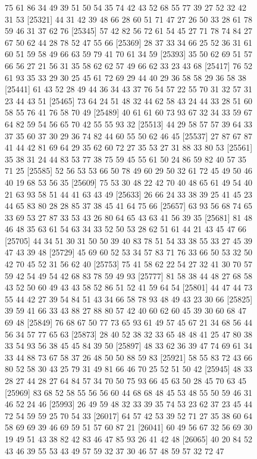 \documentclass{article}
\begin{document}
\begin{figure}[H]
\begin{Schunk}
\begin{Soutput}
[25297] 75 61 86 34 49 39 51 50 54 35 74 42 43 52 68 55 77 39 27 52 32 42 31 53
[25321] 44 31 42 39 48 66 28 60 51 71 47 27 26 50 33 28 61 78 59 46 31 37 62 76
[25345] 57 42 82 56 72 61 54 45 27 71 78 74 84 27 67 50 62 44 28 78 52 47 55 66
[25369] 28 37 33 34 66 25 52 36 31 61 60 51 59 58 49 66 63 59 79 41 70 61 34 59
[25393] 35 50 62 69 51 57 66 56 27 21 56 31 35 58 62 62 57 49 66 62 33 23 43 68
[25417] 76 52 61 93 35 33 29 30 25 45 61 72 69 29 44 40 29 36 58 58 29 36 58 38
[25441] 61 43 52 28 49 44 36 34 43 37 76 54 57 22 55 70 31 32 57 31 23 44 43 51
[25465] 73 64 24 51 48 32 44 62 58 43 24 44 33 28 51 60 58 55 76 41 76 58 70 49
[25489] 40 61 61 60 73 93 67 32 34 33 59 67 64 82 59 54 56 65 70 42 55 55 93 32
[25513] 44 29 58 57 57 39 64 33 37 35 60 37 30 29 36 74 82 44 60 55 50 62 46 45
[25537] 27 87 67 87 41 44 42 81 69 64 29 35 62 60 72 27 35 53 27 31 88 33 80 53
[25561] 35 38 31 24 44 83 53 77 38 75 59 45 55 61 50 24 86 59 82 40 57 35 71 25
[25585] 52 56 53 53 66 50 78 49 60 29 50 32 61 72 45 49 50 46 40 19 68 53 56 35
[25609] 75 53 30 48 22 42 70 40 48 65 61 49 54 40 21 63 93 58 51 44 41 63 43 49
[25633] 26 66 24 33 38 39 25 41 45 23 44 65 83 80 28 28 85 37 38 45 41 64 75 66
[25657] 63 93 56 68 74 65 33 69 53 27 87 33 53 43 26 80 64 65 43 63 41 56 39 35
[25681] 81 48 46 48 35 63 61 54 63 34 33 52 50 53 28 62 51 61 44 21 43 45 47 66
[25705] 44 34 51 30 31 50 50 39 40 83 78 51 54 33 38 55 33 27 45 39 47 43 39 48
[25729] 45 69 60 52 53 34 57 83 71 76 33 66 50 53 32 50 42 70 45 52 31 56 62 40
[25753] 75 41 58 62 22 54 27 32 41 30 70 57 59 42 54 49 54 42 68 83 78 59 49 93
[25777] 81 58 38 44 48 27 68 58 43 52 50 60 49 43 43 58 52 86 51 52 41 59 64 54
[25801] 44 47 44 73 55 44 42 27 39 54 84 51 43 34 66 58 78 93 48 49 43 23 30 66
[25825] 39 59 41 66 33 43 88 27 88 80 57 42 40 60 62 60 45 39 30 60 68 47 69 48
[25849] 76 68 67 50 77 73 65 93 61 49 57 45 67 21 34 68 56 44 56 34 57 77 65 63
[25873] 28 40 52 38 32 33 65 48 48 41 25 47 80 38 33 54 93 56 38 45 45 84 39 50
[25897] 48 33 62 36 39 47 74 69 61 34 33 44 88 73 67 58 37 26 48 50 50 88 59 83
[25921] 58 55 83 72 43 66 80 52 58 30 43 25 79 31 49 81 66 46 70 25 52 51 50 42
[25945] 48 33 28 27 44 28 27 64 84 57 34 70 50 75 93 66 45 63 50 28 45 70 63 45
[25969] 83 68 52 58 55 56 56 60 44 68 68 48 45 53 48 55 50 59 46 31 46 52 24 46
[25993] 26 49 59 48 32 33 39 35 74 53 23 62 37 23 45 44 72 54 59 59 25 70 54 33
[26017] 64 57 42 53 39 52 71 27 35 38 60 64 58 69 69 39 46 69 59 51 57 60 87 21
[26041] 60 49 56 67 32 56 69 30 19 49 51 43 38 82 42 83 46 47 85 93 26 41 42 48
[26065] 40 20 84 52 43 46 39 55 53 43 49 57 59 32 37 30 46 57 48 59 57 32 72 47

\end{Soutput}
\end{Schunk}
\end{figure}
\end{document}
